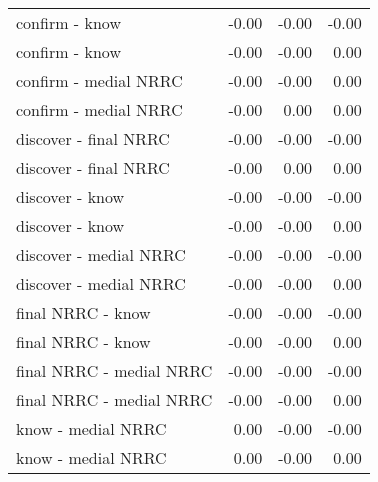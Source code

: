 \begin{longtable}{lrrr}
  confirm - know & -0.00 & -0.00 & -0.00 \\ 
  confirm - know & -0.00 & -0.00 & 0.00 \\ 
  confirm - medial NRRC & -0.00 & -0.00 & 0.00 \\ 
  confirm - medial NRRC & -0.00 & 0.00 & 0.00 \\ 
  discover - final NRRC & -0.00 & -0.00 & -0.00 \\ 
  discover - final NRRC & -0.00 & 0.00 & 0.00 \\ 
  discover - know & -0.00 & -0.00 & -0.00 \\ 
  discover - know & -0.00 & -0.00 & 0.00 \\ 
  discover - medial NRRC & -0.00 & -0.00 & -0.00 \\ 
  discover - medial NRRC & -0.00 & -0.00 & 0.00 \\ 
  final NRRC - know & -0.00 & -0.00 & -0.00 \\ 
  final NRRC - know & -0.00 & -0.00 & 0.00 \\ 
  final NRRC - medial NRRC & -0.00 & -0.00 & -0.00 \\ 
  final NRRC - medial NRRC & -0.00 & -0.00 & 0.00 \\ 
  know - medial NRRC & 0.00 & -0.00 & -0.00 \\ 
  know - medial NRRC & 0.00 & -0.00 & 0.00 \\ 
  \end{longtable}

